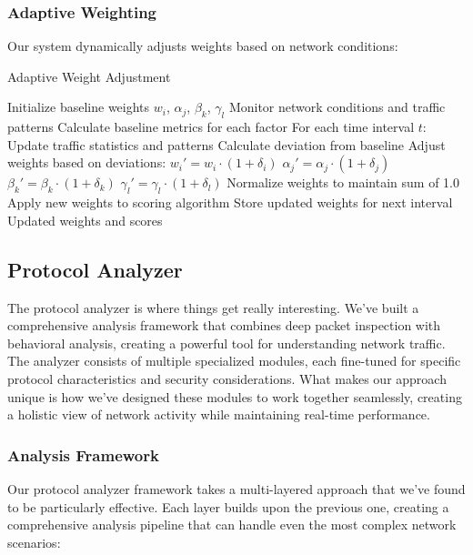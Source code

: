 \documentclass[conference]{IEEEtran}
\begin{document}
\subsubsection{Adaptive Weighting}
Our system dynamically adjusts weights based on network conditions:

\begin{algorithm}[H]
\caption{Adaptive Weight Adjustment}
\begin{algorithmic}[1]
\STATE Initialize baseline weights $w_i$, $\alpha_j$, $\beta_k$, $\gamma_l$
\STATE Monitor network conditions and traffic patterns
\STATE Calculate baseline metrics for each factor
\STATE For each time interval $t$:
\STATE \quad Update traffic statistics and patterns
\STATE \quad Calculate deviation from baseline
\STATE \quad Adjust weights based on deviations:
\STATE \quad \quad $w_i' = w_i \cdot (1 + \delta_i)$
\STATE \quad \quad $\alpha_j' = \alpha_j \cdot (1 + \delta_j)$
\STATE \quad \quad $\beta_k' = \beta_k \cdot (1 + \delta_k)$
\STATE \quad \quad $\gamma_l' = \gamma_l \cdot (1 + \delta_l)$
\STATE \quad Normalize weights to maintain sum of 1.0
\STATE \quad Apply new weights to scoring algorithm
\STATE \quad Store updated weights for next interval
\RETURN Updated weights and scores
\end{algorithmic}
\end{algorithm}

\subsection{Protocol Analyzer}
The protocol analyzer is where things get really interesting. We've built a comprehensive analysis framework that combines deep packet inspection with behavioral analysis, creating a powerful tool for understanding network traffic. The analyzer consists of multiple specialized modules, each fine-tuned for specific protocol characteristics and security considerations. What makes our approach unique is how we've designed these modules to work together seamlessly, creating a holistic view of network activity while maintaining real-time performance.

\subsubsection{Analysis Framework}
Our protocol analyzer framework takes a multi-layered approach that we've found to be particularly effective. Each layer builds upon the previous one, creating a comprehensive analysis pipeline that can handle even the most complex network scenarios:
\end{document}
